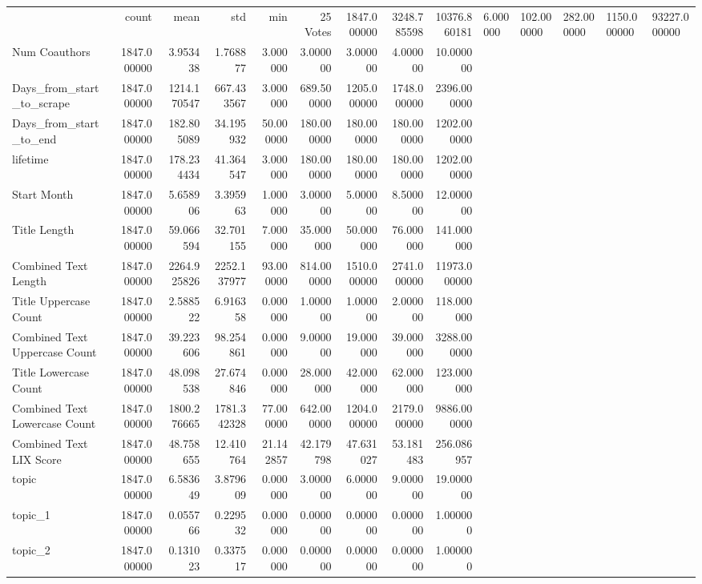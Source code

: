 \begin{tabular}{lrrrrrrrr}
\toprule
 & count & mean & std & min & 25%
\midrule
Votes & 1847.000000 & 3248.785598 & 10376.860181 & 6.000000 & 102.000000 & 282.000000 & 1150.000000 & 93227.000000 \\
Num Coauthors & 1847.000000 & 3.953438 & 1.768877 & 3.000000 & 3.000000 & 3.000000 & 4.000000 & 10.000000 \\
Days_from_start_to_scrape & 1847.000000 & 1214.170547 & 667.433567 & 3.000000 & 689.500000 & 1205.000000 & 1748.000000 & 2396.000000 \\
Days_from_start_to_end & 1847.000000 & 182.805089 & 34.195932 & 50.000000 & 180.000000 & 180.000000 & 180.000000 & 1202.000000 \\
lifetime & 1847.000000 & 178.234434 & 41.364547 & 3.000000 & 180.000000 & 180.000000 & 180.000000 & 1202.000000 \\
Start Month & 1847.000000 & 5.658906 & 3.395963 & 1.000000 & 3.000000 & 5.000000 & 8.500000 & 12.000000 \\
Title Length & 1847.000000 & 59.066594 & 32.701155 & 7.000000 & 35.000000 & 50.000000 & 76.000000 & 141.000000 \\
Combined Text Length & 1847.000000 & 2264.925826 & 2252.137977 & 93.000000 & 814.000000 & 1510.000000 & 2741.000000 & 11973.000000 \\
Title Uppercase Count & 1847.000000 & 2.588522 & 6.916358 & 0.000000 & 1.000000 & 1.000000 & 2.000000 & 118.000000 \\
Combined Text Uppercase Count & 1847.000000 & 39.223606 & 98.254861 & 0.000000 & 9.000000 & 19.000000 & 39.000000 & 3288.000000 \\
Title Lowercase Count & 1847.000000 & 48.098538 & 27.674846 & 0.000000 & 28.000000 & 42.000000 & 62.000000 & 123.000000 \\
Combined Text Lowercase Count & 1847.000000 & 1800.276665 & 1781.342328 & 77.000000 & 642.000000 & 1204.000000 & 2179.000000 & 9886.000000 \\
Combined Text LIX Score & 1847.000000 & 48.758655 & 12.410764 & 21.142857 & 42.179798 & 47.631027 & 53.181483 & 256.086957 \\
topic & 1847.000000 & 6.583649 & 3.879609 & 0.000000 & 3.000000 & 6.000000 & 9.000000 & 19.000000 \\
topic_1 & 1847.000000 & 0.055766 & 0.229532 & 0.000000 & 0.000000 & 0.000000 & 0.000000 & 1.000000 \\
topic_2 & 1847.000000 & 0.131023 & 0.337517 & 0.000000 & 0.000000 & 0.000000 & 0.000000 & 1.000000 \\

\end{tabular}
